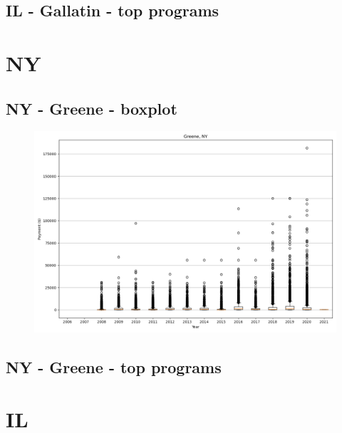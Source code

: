 \subsection*{IL - Gallatin - top programs}

\newpage
\section*{NY}
\subsection*{NY - Greene - boxplot}
\begin{figure}[h]
\centering
\includegraphics[width=7in]{../output/boxplots/counties/Greene-NY_boxplot.png}
\end{figure}


\subsection*{NY - Greene - top programs}

\newpage
\section*{IL}
